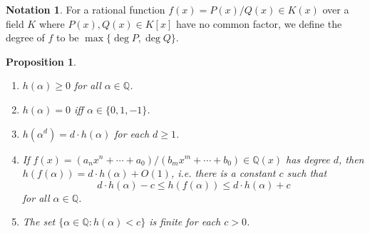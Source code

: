 \documentclass[a4paper]{article}
\newtheorem{proposition}[theorem]{Proposition}
\theoremstyle{definition}
\newtheorem*{notation}{Notation}
\newcommand{\Q}{\mathbb{Q}}
\begin{document}
\begin{notation}
    For a rational function $f(x)=P(x)/Q(x)\in K(x)$ over a field $K$ where
    $P(x),Q(x)\in K[x]$ have no common factor, we define the degree of $f$ to be
    $\max\{\deg P,\deg Q\}$.
\end{notation}

\begin{proposition}
    ~
    \begin{enumerate}[label=(\roman*)]
        \item $h(\alpha)\ge0$ for all $\alpha\in\Q$.

        \item $h(\alpha)=0$ iff $\alpha\in\{0,1,-1\}$.

        \item $h(\alpha^d)=d\cdot h(\alpha)$ for each $d\ge1$.

        \item If $f(x)=(a_nx^n+\cdots+a_0)/(b_mx^m+\cdots+b_0)\in\Q(x)$ has
            degree $d$, then $h(f(\alpha))=d\cdot h(\alpha)+O(1)$, i.e. there is
            a constant $c$ such that
            \begin{equation*}
                d\cdot h(\alpha) - c \le h(f(\alpha)) \le d\cdot h(\alpha) + c
            \end{equation*}
            for all $\alpha\in\Q$.

        \item The set $\{\alpha\in\Q:h(\alpha)<c\}$ is finite for each $c>0$.
    \end{enumerate}
\end{proposition}
\end{document}
